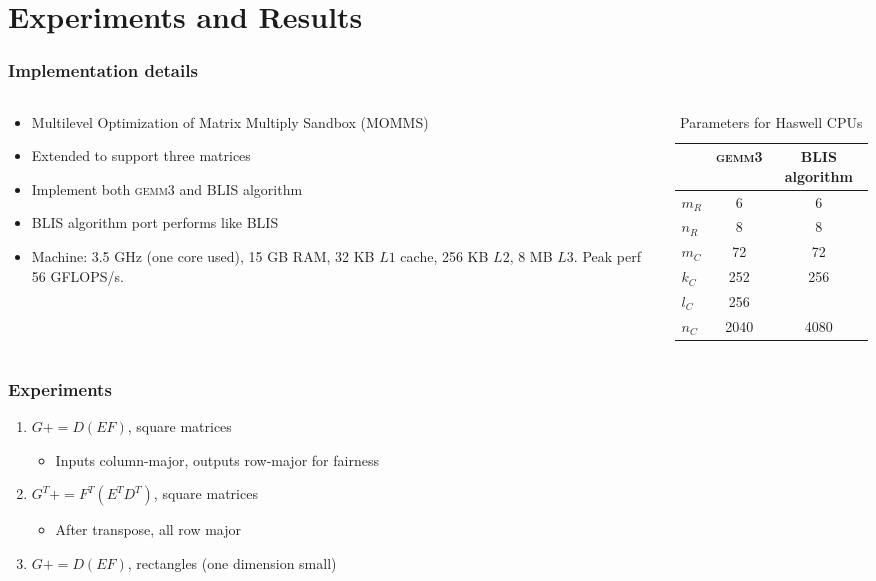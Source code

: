\documentclass{beamer}
\newcommand*{\pluseq}{\mathrel{{+}{=}}}
\newcommand*{\gemmt}{{\textsc{gemm3}}}
\begin{document}
\section[Results]{Experiments and Results}
\frame{\sectionpage}

\begin{frame}
  \frametitle{Implementation details}
  \begin{columns}
    \begin{column}{0.5\textwidth}
      \begin{itemize}
      \item Multilevel Optimization of Matrix Multiply Sandbox (MOMMS)
      \item Extended to support three matrices
      \item Implement both \gemmt{} and BLIS algorithm
      \item BLIS algorithm port performs like BLIS
      \item Machine: 3.5 GHz (one core used), 15 GB RAM, 32 KB $L1$ cache, 256 KB $L2$, 8 MB $L3$. Peak perf 56 GFLOPS/s.
      \end{itemize}
    \end{column}
    \begin{column}{0.5\textwidth}
      \begin{table}
        \centering
        \begin{tabular}{l|c c}
          &\gemmt{}&BLIS algorithm\\ \hline
          $m_R$&6&6\\
          $n_R$&8&8\\
          $m_C$&72&72\\
          $k_C$&252&256\\
          $l_C$&256&\\
          $n_C$&2040&4080\\
        \end{tabular}
        \caption{Parameters for Haswell CPUs}
        \label{tab:haswell-paramss}
      \end{table}
    \end{column}
  \end{columns}
\end{frame}

\begin{frame}
  \frametitle{Experiments}
  \begin{enumerate}
  \item $G \pluseq D(EF)$, square matrices
    \begin{itemize}
    \item Inputs column-major, outputs row-major for fairness
    \end{itemize}
  \item $G^T \pluseq F^T(E^TD^T)$, square matrices
    \begin{itemize}
    \item After transpose, all row major
    \end{itemize}
  \item $G \pluseq D(EF)$, rectangles (one dimension small)
  \end{enumerate}
\end{frame}
\end{document}
